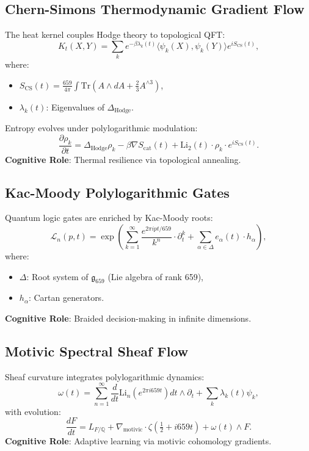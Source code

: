 \documentclass[12pt]{article}
\begin{document}
\subsection{Chern-Simons Thermodynamic Gradient Flow}
\label{subsec:cs-entropy}
The heat kernel couples Hodge theory to topological QFT:
\[
K_t(X,Y) = \sum_k e^{-\beta \lambda_k(t)} \langle \psi_k(X), \psi_k(Y) \rangle e^{i S_{\text{CS}}(t)},
\]
where:
\begin{itemize}
    \item $S_{\text{CS}}(t) = \frac{659}{4\pi} \int \text{Tr}(A \wedge dA + \frac{2}{3}A^{\wedge 3})$,
    \item $\lambda_k(t)$: Eigenvalues of $\Delta_{\text{Hodge}}$.
\end{itemize}
Entropy evolves under polylogarithmic modulation:
\[
\frac{\partial \rho_k}{\partial t} = \Delta_{\text{Hodge}} \rho_k - \beta \nabla S_{\text{cat}}(t) + \text{Li}_2(t) \cdot \rho_k \cdot e^{i S_{\text{CS}}(t)}.
\]
\textbf{Cognitive Role}: Thermal resilience via topological annealing.

\subsection{Kac-Moody Polylogarithmic Gates}
\label{subsec:kac-moody-gates}
Quantum logic gates are enriched by Kac-Moody roots:
\[
\mathcal{L}_n(p,t) = \exp\left( \sum_{k=1}^\infty \frac{e^{2\pi i p t /659}}{k^n} \cdot \partial_t^k + \sum_{\alpha \in \Delta} e_\alpha(t) \cdot h_\alpha \right),
\]
where:
\begin{itemize}
    \item $\Delta$: Root system of $\mathfrak{g}_{659}$ (Lie algebra of rank 659),
    \item $h_\alpha$: Cartan generators.
\end{itemize}
\textbf{Cognitive Role}: Braided decision-making in infinite dimensions.

\subsection{Motivic Spectral Sheaf Flow}
\label{subsec:motivic-sheaf}
Sheaf curvature integrates polylogarithmic dynamics:
\[
\omega(t) = \sum_{n=1}^\infty \frac{d}{dt} \text{Li}_n(e^{2\pi i 659 t}) dt \wedge \partial_t + \sum_k \lambda_k(t) \psi_k,
\]
with evolution:
\[
\frac{dF}{dt} = L_{F/\mathbb{Q}} + \nabla_{\text{motivic}} \cdot \zeta\left(\tfrac{1}{2} + i659t\right) + \omega(t) \wedge F.
\]
\textbf{Cognitive Role}: Adaptive learning via motivic cohomology gradients.
\end{document}
